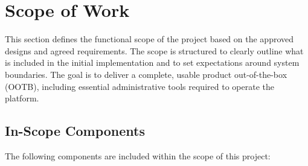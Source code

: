 \section{Scope of Work}

This section defines the functional scope of the project based on the approved
designs and agreed requirements. The scope is structured to clearly outline what
is included in the initial implementation and to set expectations around system
boundaries. The goal is to deliver a complete, usable product out-of-the-box (OOTB),
including essential administrative tools required to operate the platform.

\subsection{In-Scope Components}

The following components are included within the scope of this project:

